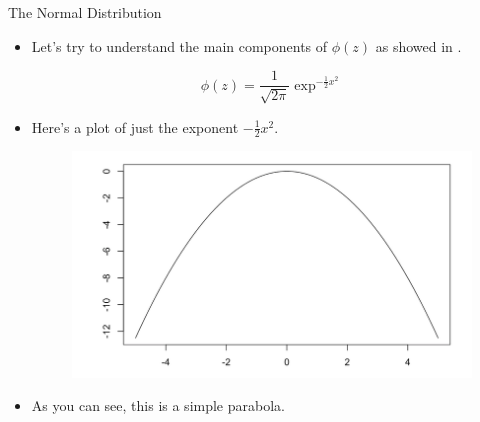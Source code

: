 \documentclass[handout]{beamer}
\begin{document}
\begin{frame}{The Normal Distribution}

\scriptsize{
\begin{itemize}
 \item Let's try to understand the main components of $\phi(z)$ as showed in \cite{colin2020}.
 
  \begin{displaymath}
  \phi(z) = \frac{1}{\sqrt{2\pi}} \exp^{-\frac{1}{2}x^2}
 \end{displaymath}
 
 \item Here's a plot of just the exponent $-\frac{1}{2}x^2$.
 
  \begin{figure}[h!]
	\centering
	\includegraphics[scale=0.2]{pics/gauss_exp.png}
\end{figure}
 
 \item As you can see, this is a simple parabola. 

 \end{itemize}

}
\end{frame}
\end{document}
